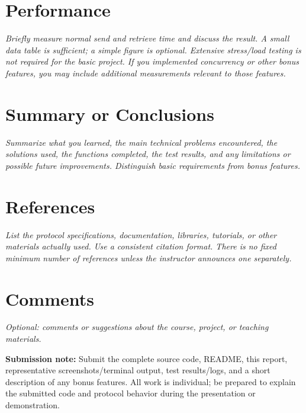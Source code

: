 \documentclass[11pt,a4paper]{article}
\newcommand{\prompt}[1]{\textit{#1}}
\begin{document}
\vspace{3em}

\section{Performance}
\prompt{Briefly measure normal send and retrieve time and discuss the result. A small data table is sufficient; a simple figure is optional. Extensive stress/load testing is not required for the basic project. If you implemented concurrency or other bonus features, you may include additional measurements relevant to those features.}

\vspace{3em}

\section{Summary or Conclusions}
\prompt{Summarize what you learned, the main technical problems encountered, the solutions used, the functions completed, the test results, and any limitations or possible future improvements. Distinguish basic requirements from bonus features.}

\vspace{3em}

\section{References}
\prompt{List the protocol specifications, documentation, libraries, tutorials, or other materials actually used. Use a consistent citation format. There is no fixed minimum number of references unless the instructor announces one separately.}

\vspace{3em}

\section{Comments}
\prompt{Optional: comments or suggestions about the course, project, or teaching materials.}

\vfill

\noindent\textbf{Submission note:}
Submit the complete source code, README, this report, representative screenshots/terminal output, test results/logs, and a short description of any bonus features. All work is individual; be prepared to explain the submitted code and protocol behavior during the presentation or demonstration.
\end{document}
